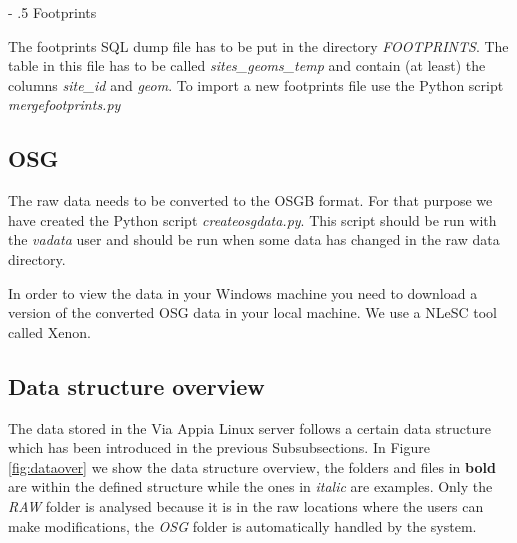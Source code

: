 \documentclass[a4paper,11pt]{article}
\makeatletter
\renewcommand\paragraph{%
   \@startsection{paragraph}{4}{0mm}%
      {-\baselineskip}%
      {.5\baselineskip}%
      {\normalfont\normalsize\bfseries}}
\makeatother
\begin{document}
\paragraph{Footprints}

The footprints SQL dump file has to be put in the directory \textit{FOOTPRINTS}. The table in this file has to be called \textit{sites\_geoms\_temp} and contain (at least) the columns \textit{site\_id} and \textit{geom}. To import a new footprints file use the Python script \textit{mergefootprints.py}

\subsection{OSG}

The raw data needs to be converted to the OSGB format. For that purpose we have created the Python script \textit{createosgdata.py}. This script should be run with the \textit{vadata} user and should be run when some data has changed in the raw data directory.

In order to view the data in your Windows machine you need to download a version of the converted OSG data in your local machine. We use a NLeSC tool called Xenon.

\subsection{Data structure overview}
\label{sec:structoverview}

The data stored in the Via Appia Linux server follows a certain data structure which has been introduced in the previous Subsubsections. In Figure \ref{fig:dataover} we show the data structure overview, the folders and files in \textbf{bold} are within the defined structure while the ones in \textit{italic} are examples. Only the \textit{RAW} folder is analysed because it is in the raw locations where the users can make modifications, the \textit{OSG} folder is automatically handled by the system.
\end{document}
